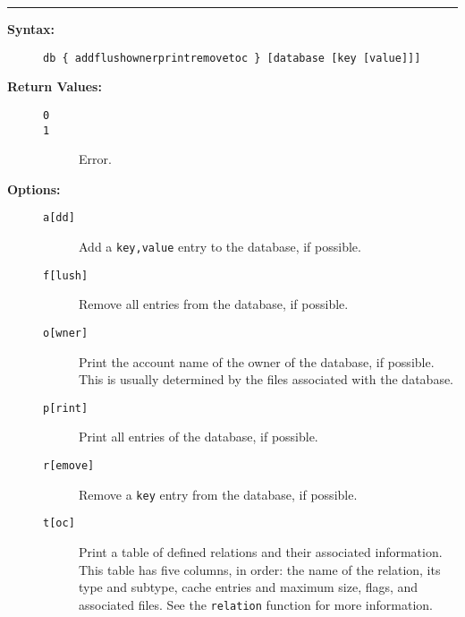 \hrule
\begin{description}
\item[{\bf Syntax:}] \mbox{}

{\tt db \{ add{\verbar}flush{\verbar}owner{\verbar}print{\verbar}remove{\verbar}toc \} [database [key [value]]]}



\item[{\bf Return Values:}] \mbox{}

\begin{description}
\item[{\tt 0}] \mbox{}



\item[{\tt 1}] \mbox{}

Error.

\end{description}


\item[{\bf Options:}] \mbox{}

\begin{description}
\item[{\tt a[dd]}] \mbox{}

Add a {\tt key,value} 
entry to the database, if possible.

\item[{\tt f[lush]}] \mbox{}

Remove all entries from the database, 
if possible.

\item[{\tt o[wner]}] \mbox{}

Print the account name of the owner 
of the database, if possible. This is usually determined by the 
files associated with the database.

\item[{\tt p[rint]}] \mbox{}

Print all entries of the database, 
if possible. 

\item[{\tt r[emove]}] \mbox{}

Remove a {\tt key} entry 
from the database, if possible.

\item[{\tt t[oc]}] \mbox{}

Print a table of defined relations 
and their associated information. This table has five columns, 
in order: the name of the relation, its type and subtype, cache 
entries and maximum size, flags, and associated files. See the 
{\tt relation} function for more information.


\end{description}
\end{description}
